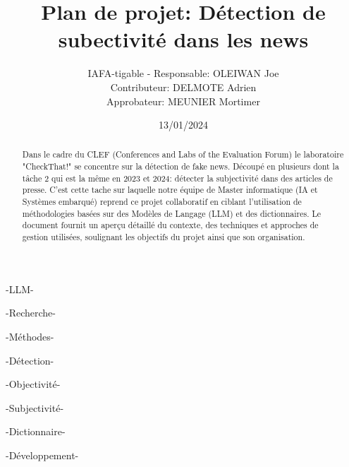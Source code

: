 \documentclass[11pt]{rapport_class}
\title{Plan de projet: Détection de subectivité dans les news}
\author{IAFA-tigable - Responsable: OLEIWAN Joe \\ Contributeur: DELMOTE Adrien \\ Approbateur: MEUNIER Mortimer}
\date{13/01/2024}
\begin{document}
\maketitle

\begin{abstract}
Dans le cadre du CLEF (Conferences and Labs of the Evaluation Forum) le laboratoire "CheckThat!" se concentre sur la détection de fake news. Découpé en plusieurs dont la tâche 2 qui est la même en 2023 et 2024: détecter la subjectivité dans des articles de presse. C'est cette tache sur laquelle notre équipe de Master informatique (IA et Systèmes embarqué) reprend ce projet collaboratif en ciblant l'utilisation de méthodologies basées sur des Modèles de Langage (LLM) et des dictionnaires. Le document fournit un aperçu détaillé du contexte, des techniques et approches de gestion utilisées, soulignant les objectifs du projet ainsi que son organisation.
\end{abstract}

\smallskip
\begin{motsclefs}
\smallskip
\centerline{-LLM-}
\centerline{-Recherche-}
\centerline{-Méthodes-}
\centerline{-Détection-}
\centerline{-Objectivité-}
\centerline{-Subjectivité-}
\centerline{-Dictionnaire-}
\centerline{-Développement-}
\end{motsclefs}

\tableofcontents
\end{document}
